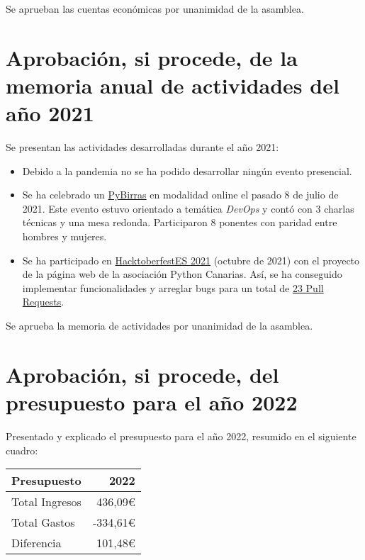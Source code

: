 \documentclass[a4paper,12pt]{article}
\begin{document}
Se aprueban las cuentas económicas por unanimidad de la asamblea.

\section{Aprobación, si procede, de la memoria anual de actividades del año 2021}

Se presentan las actividades desarrolladas durante el año 2021:

\begin{itemize}
    \item Debido a la pandemia no se ha podido desarrollar ningún evento presencial.
    \item Se ha celebrado un \href{https://pythoncanarias.es/events/pybirrasdevops/}{PyBirras} en modalidad online el pasado 8 de julio de 2021. Este evento estuvo orientado a temática \textit{DevOps} y contó con 3 charlas técnicas y una mesa redonda. Participaron 8 ponentes con paridad entre hombres y mujeres.
    \item Se ha participado en \href{https://hacktoberfestes.dev/#proyectos}{HacktoberfestES 2021} (octubre de 2021) con el proyecto de la página web de la asociación Python Canarias. Así, se ha conseguido implementar funcionalidades y arreglar bugs para un total de \href{https://github.com/pythoncanarias/pycan-web/pulls?q=is%3Apr+is%3Aclosed+label%3Ahacktoberfest}{23 Pull Requests}.
\end{itemize}

Se aprueba la memoria de actividades por unanimidad de la asamblea.

\section{Aprobación, si procede, del presupuesto para el año 2022}

Presentado y explicado el presupuesto para el año 2022, resumido
en el siguiente cuadro:

\begin{center}
    \begin{tabular}{ | l | r | }
        \hline
        \textbf{Presupuesto} & \textbf{2022} \\ 
        \hline
        Total Ingresos & 436,09\euro \\  
        \hline
        Total Gastos & -334,61\euro \\  
        \hline
        \hline
        Diferencia & 101,48\euro \\  
        \hline
    \end{tabular}
\end{center}
\end{document}
